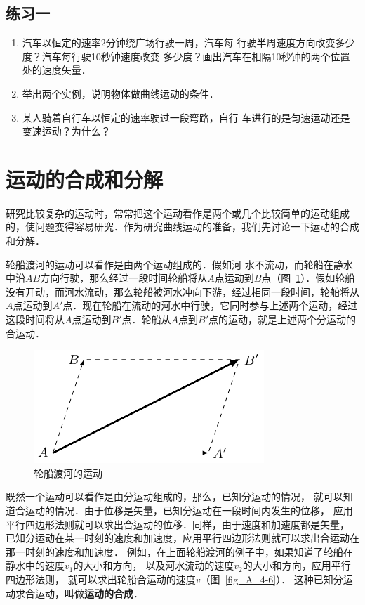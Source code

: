 \subsection*{练习一}
\begin{enumerate}
\item 汽车以恒定的速率2分钟绕广场行驶一周，汽车每
行驶半周速度方向改变多少度？汽车每行驶10秒钟速度改变
多少度？画出汽车在相隔10秒钟的两个位置处的速度矢量．
\item 举出两个实例，说明物体做曲线运动的条件．
\item 某人骑着自行车以恒定的速率驶过一段弯路，自行
车进行的是匀速运动还是变速运动？为什么？
\end{enumerate}


\section{运动的合成和分解}
研究比较复杂的运动时，常常把这个运动看作是两个或几个比较简单的运动组成的，使问题变得容易研究．作为研究曲线运动的准备，我们先讨论一下运动的合成和分解．

轮船渡河的运动可以看作是由两个运动组成的．假如河
水不流动，而轮船在静水中沿$AB$方向行驶，那么经过一段时间轮船将从$A$点运动到$B$点（图~\ref{fig_A_4-5}）．假如轮船没有开动，而河水流动，那么轮船被河水冲向下游，经过相同一段时间，轮船将从$A$点运动到$A'$点．现在轮船在流动的河水中行驶，它同时参与上述两个运动，经过这段时间将从$A$点运动到$B'$点．轮船从$A$点到$B'$点的运动，就是上述两个分运动的合运动．

\begin{figure}[htbp]
    \centering
    \includegraphics{fig/A/4-5.pdf}
    \caption{轮船渡河的运动}\label{fig_A_4-5}
\end{figure}

既然一个运动可以看作是由分运动组成的，那么，已知分运动的情况，
就可以知道合运动的情况．由于位移是矢量，已知分运动在一段时间内发生的位移，
应用平行四边形法则就可以求出合运动的位移．同样，由于速度和加速度都是矢量，
已知分运动在某一时刻的速度和加速度，应用平行四边形法则就可以求出合运动在那一时刻的速度和加速度．
例如，在上面轮船渡河的例子中，如果知道了轮船在静水中的速度$v_1$的大小和方向，
以及河水流动的速度$v_2$的大小和方向，应用平行四边形法则，
就可以求出轮船合运动的速度$v$（图~\ref{fig_A_4-6}）．
这种已知分运动求合运动，叫做\textbf{运动的合成}．

